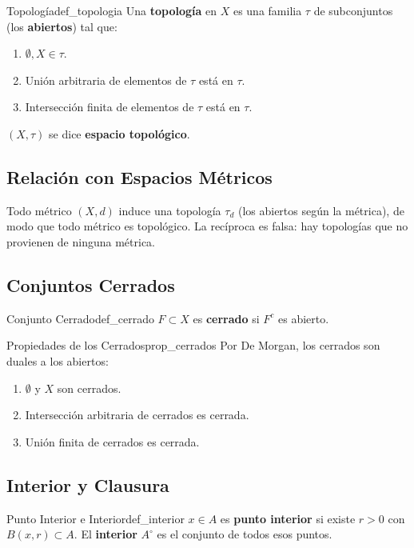 \documentclass[11pt, a4paper]{article}
\begin{document}
\begin{definicion}{Topología}{def_topologia}
Una \textbf{topología} en $X$ es una familia $\tau$ de subconjuntos (los \textbf{abiertos}) tal que:
\begin{enumerate}
    \item $\emptyset, X \in \tau$.
    \item Unión arbitraria de elementos de $\tau$ está en $\tau$.
    \item Intersección finita de elementos de $\tau$ está en $\tau$.
\end{enumerate}
$(X, \tau)$ se dice \textbf{espacio topológico}.
\end{definicion}

\subsection{Relación con Espacios Métricos}

Todo métrico $(X, d)$ induce una topología $\tau_d$ (los abiertos según la métrica), de modo
que todo métrico es topológico. La recíproca es falsa: hay topologías que no provienen de
ninguna métrica. 

\subsection{Conjuntos Cerrados}

\begin{definicion}{Conjunto Cerrado}{def_cerrado}
$F \subset X$ es \textbf{cerrado} si $F^c$ es abierto.
\end{definicion}

\begin{proposicion}{Propiedades de los Cerrados}{prop_cerrados}
Por De Morgan, los cerrados son duales a los abiertos:
\begin{enumerate}
    \item $\emptyset$ y $X$ son cerrados.
    \item Intersección arbitraria de cerrados es cerrada.
    \item Unión finita de cerrados es cerrada.
\end{enumerate}
\end{proposicion}

\subsection{Interior y Clausura}

\begin{definicion}{Punto Interior e Interior}{def_interior}
$x \in A$ es \textbf{punto interior} si existe $r > 0$ con $B(x, r) \subset A$. El \textbf{interior}
$A^\circ$ es el conjunto de todos esos puntos.
\end{definicion}
\end{document}
